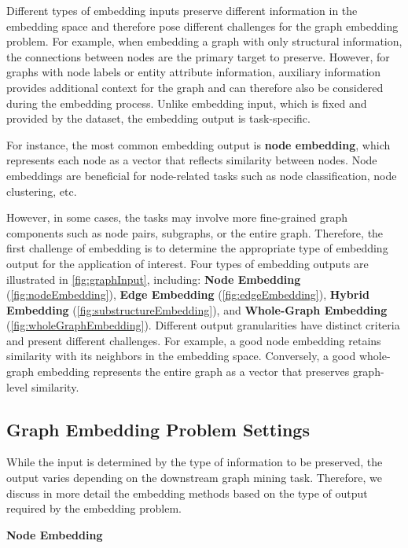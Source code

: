 Different types of embedding inputs preserve different information in the embedding space and therefore pose different challenges for the graph embedding problem. 
For example, when embedding a graph with only structural information, the connections between nodes are the primary target to preserve. However, for graphs with node labels or entity attribute information, auxiliary information provides additional context for the graph and can therefore also be considered during the embedding process. Unlike embedding input, which is fixed and provided by the dataset, the embedding output is task-specific.

For instance, the most common embedding output is \textbf{node embedding}, which represents each node as a vector that reflects similarity between nodes. Node embeddings are beneficial for node-related tasks such as node classification, node clustering, etc.

However, in some cases, the tasks may involve more fine-grained graph components such as node pairs, subgraphs, or the entire graph. Therefore, the first challenge of embedding is to determine the appropriate type of embedding output for the application of interest. Four types of embedding outputs are illustrated in \autoref{fig:graphInput}, including: \textbf{Node Embedding} (\ref{fig:nodeEmbedding}), \textbf{Edge Embedding} (\ref{fig:edgeEmbedding}), \textbf{Hybrid Embedding} (\ref{fig:substructureEmbedding}), and \textbf{Whole-Graph Embedding} (\ref{fig:wholeGraphEmbedding}). Different output granularities have distinct criteria and present different challenges. For example, a good node embedding retains similarity with its neighbors in the embedding space. Conversely, a good whole-graph embedding represents the entire graph as a vector that preserves graph-level similarity.


\subsection{Graph Embedding Problem Settings}

While the input is determined by the type of information to be preserved, the output varies depending on the downstream graph mining task. Therefore, we discuss in more detail the embedding methods based on the type of output required by the embedding problem.

\textbf{Node Embedding}
\label{sec:nodeEmbedding}

